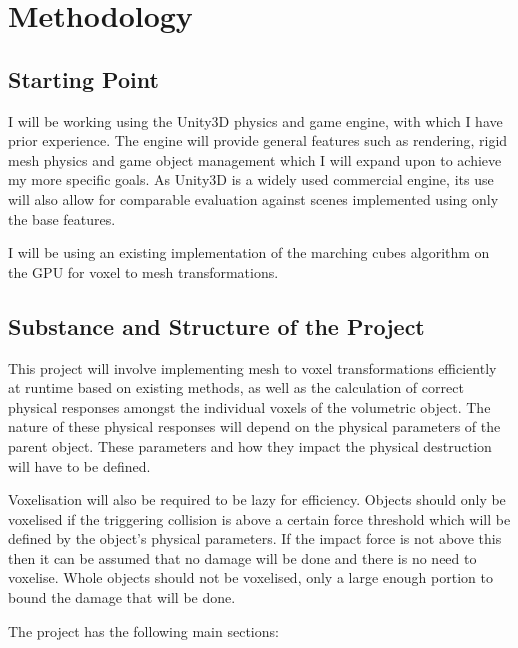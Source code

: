 
\section{Methodology}

\subsection{Starting Point}

I will be working using the Unity3D physics and game engine, with which I have prior experience. The engine will provide general features such as rendering, rigid mesh physics and game object management which I will expand upon to achieve my more specific goals. As Unity3D is a widely used commercial engine, its use will also allow for comparable evaluation against scenes implemented using only the base features.

I will be using an existing implementation of the marching cubes algorithm on the GPU for voxel to mesh transformations\cite{MCGPU}.


\subsection{Substance and Structure of the Project}

This project will involve implementing mesh to voxel transformations efficiently at runtime based on existing methods\cite{V,SW,OCL}, as well as the calculation of correct physical responses amongst the individual voxels of the volumetric object. The nature of these physical responses will depend on the physical parameters of the parent object. These parameters and how they impact the physical destruction will have to be defined.

Voxelisation will also be required to be lazy for efficiency. Objects should only be voxelised if the triggering collision is above a certain force threshold which will be defined by the object's physical parameters. If the impact force is not above this then it can be assumed that no damage will be done and there is no need to voxelise. Whole objects should not be voxelised, only a large enough portion to bound the damage that will be done. 

The project has the following main sections:

